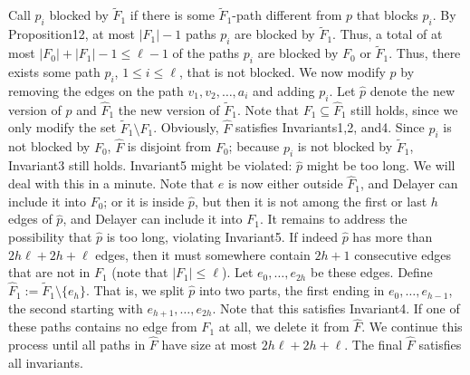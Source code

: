 Call $p_i$ blocked by $\widetilde F_1$ if there is some $\widetilde F_1$-path different from $p$ that blocks $p_i$. By Proposition12, at most $|F_1|-1$ paths $p_i$ are blocked by $\widetilde F_1$. Thus, a total of at most $|F_0|+|F_1|-1\le\ell-1$ of the paths $p_i$ are blocked by $F_0$ or $\widetilde F_1$. Thus, there exists some path $p_i$, $1\le i\le\ell$, that is not blocked. We now modify $p$ by removing the edges on the path $v_1,v_2,\ldots,a_i$ and adding $p_i$. Let $\hat p$ denote the new version of $p$ and $\hat F_1$ the new version of $\widetilde F_1$. Note that $F_1\subseteq\hat F_1$ still holds, since we only modify the set $\widetilde F_1\setminus F_1$. Obviously, $\hat F$ satisfies Invariants1,2, and4. Since $p_i$ is not blocked by $F_0$, $\hat F$ is disjoint from $F_0$; because $p_i$ is not blocked by $\widetilde F_1$, Invariant3 still holds. Invariant5 might be violated: $\hat p$ might be too long. We will deal with this in a minute.
Note that $e$ is now either outside $\hat F_1$, and Delayer can include it into $F_0$; or it is inside $\hat p$, but then it is not among the first or last $h$ edges of $\hat p$, and Delayer can include it into $F_1$.
It remains to address the possibility that $\hat p$ is too long, violating Invariant5. If indeed $\hat p$ has more than $2h\ell+2h+\ell$ edges, then it must somewhere contain $2h+1$ consecutive edges that are not in $F_1$ (note that $|F_1|\le\ell$). Let $e_0,\ldots,e_{2h}$ be these edges. Define $\hat F_1:=\widetilde F_1\setminus\{e_h\}$. That is, we split $\hat p$ into two parts, the first ending in $e_0,\ldots,e_{h-1}$, the second starting with $e_{h+1},\ldots,e_{2h}$. Note that this satisfies Invariant4. If one of these paths contains no edge from $F_1$ at all, we delete it from $\hat F$. We continue this process until all paths in $\hat F$ have size at most $2h\ell+2h+\ell$. The final $\hat F$ satisfies all invariants.
